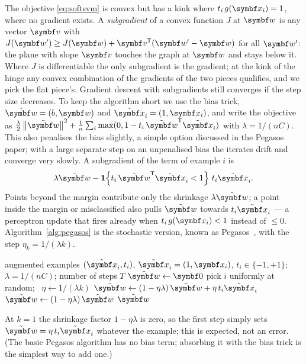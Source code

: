 \documentclass[11pt]{article}
\newcommand{\w}{\vect{w}}
\newcommand{\xt}{\tilde{\x}}
\newcommand{\wt}{\tilde{\w}}
\begin{document}
The objective \eqref{eq:softsvm} is convex but has a kink where $t_i\,g(\x_i) = 1$, where no gradient exists. A
\emph{subgradient} of a convex function $J$ at $\w$ is any vector $\vect{v}$ with $J(\w') \ge J(\w) + \vect{v}\T(\w'
- \w)$ for all $\w'$: the plane with slope $\vect{v}$ touches the graph at $\w$ and stays below it. Where $J$ is
differentiable the only subgradient is the gradient; at the kink of the hinge any convex combination of the gradients of
the two pieces qualifies, and we pick the flat piece's. Gradient descent with subgradients still converges if the step
size decreases. To keep the algorithm short we use the bias trick, $\wt = (b, \w)$ and $\xt_i = (1, \x_i)$, and write the
objective as $\frac{\lambda}{2}\norm{\wt}^2 + \frac1n\sum_i \max(0, 1 - t_i\,\wt\T\xt_i)$ with $\lambda = 1/(nC)$. This
also penalises the bias slightly, a simple option discussed in the Pegasos paper; with a large separate step on an unpenalised bias the
iterates drift and converge very slowly. A subgradient of the term of example $i$ is
\[
  \lambda\wt - \ind{t_i\,\wt\T\xt_i < 1}\, t_i\xt_i .
\]
Points beyond the margin contribute only the shrinkage $\lambda\wt$; a point inside the margin or misclassified also pulls
$\wt$ towards $t_i\xt_i$ --- a perceptron update that fires already when $t_i\,g(\x_i) < 1$ instead of $\le 0$.
Algorithm~\ref{alg:pegasos} is the stochastic version, known as Pegasos~\cite{shalevshwartz2007}, with the step
$\eta_k = 1/(\lambda k)$.

\begin{algorithm}[htbp]
\caption{Soft-margin linear SVM by stochastic subgradient descent (Pegasos-style).}\label{alg:pegasos}
\begin{algorithmic}[1]
\Require augmented examples $(\xt_i, t_i)$, $\xt_i = (1, \x_i)$, $t_i \in \{-1, +1\}$; $\lambda = 1/(nC)$; number of steps $T$
\State $\wt \gets \vect{0}$ \Comment{$\wt = (b, \w)$: the bias is shrunk like the weights}
  \State pick $i$ uniformly at random; \ $\eta \gets 1/(\lambda k)$
  \If{$t_i\,\wt\T\xt_i < 1$} 
    \State $\wt \gets (1 - \eta\lambda)\,\wt + \eta\,t_i\xt_i$
  \Else
    \State $\wt \gets (1 - \eta\lambda)\,\wt$ 
  \EndIf
\EndFor
\State \Return $\wt$ 
\end{algorithmic}
\end{algorithm}

At $k = 1$ the shrinkage factor $1 - \eta\lambda$ is zero, so the first step simply sets $\wt = \eta\,t_i\xt_i$ whatever
the example; this is expected, not an error. (The basic Pegasos algorithm has no bias term; absorbing it with the bias trick is
the simplest way to add one.)
\end{document}

